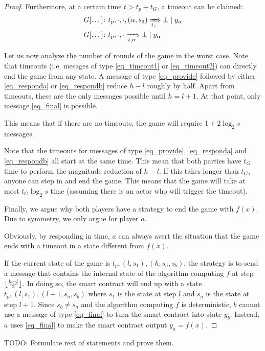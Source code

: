 \documentclass[11pt,letterpaper]{article}
\DeclarePairedDelimiter\floor{\lfloor}{\rfloor}
\begin{document}
\begin{proof}
Furthermore, at a certain time $t > t_p + t_G$, a timeout can be claimed:
\begin{align}
&G[\dots]\colon
    t_p, \cdot, \cdot, (\alpha, s_2)
    \xRightarrow[t, \cdot]{} \bot \mid y_\alpha\label{eq_timeout1}\\
&G[\dots]\colon
    t_p, \cdot, \cdot
    \xRightarrow[t, \alpha]{} \bot \mid y_\alpha\label{eq_timeout2}
\end{align}

Let us now analyze the number of rounds of the game in the worst case. Note that timeouts
(i.e. mesages of type \eqref{eq_timeout1} or \eqref{eq_timeout2}) can directly end the game from
any state.
A message of type
\eqref{eq_provide} followed by either \eqref{eq_responda} or \eqref{eq_respondb} reduce
$h-l$ roughly by half. Apart from timeouts, these are the only messages possible until
$h = l+1$. At that point, only message \eqref{eq_final} is possible.

This means that if there are no timeouts, the game will require $1 + 2 \log_2 s$ messages.

Note that the timeouts for messages of type \eqref{eq_provide}, \eqref{eq_responda} and \eqref{eq_respondb}
all start at the same time. This mean that both parties have $t_G$ time to perform the
magnitude reduction of $h-l$. If this takes longer than $t_G$, anyone can step in and end the game.
This means that the game will take at most $t_G \log_2 s$ time (assuming there is an
actor who will trigger the timeout).

Finally, we argue why both players have a strategy to end the game with $f(x)$.
Due to symmetry, we only argue for player $a$.

Obviously, by responding in time, $a$ can always avert the situation that the game
ends with a timeout in a state different from $f(x)$.

If the current state of the game is $t_p, (l, s_1), (h, s_a, s_b)$, the strategy is
to send a message that contains the internal state of the algorithm computing $f$ at step
$\floor{\frac{h-l}{2}}$. In doing so, the smart contract will end up with a state
$t_p, (l, s_1), (l+1, s_a, s_b)$ where $s_1$ is the state at step $l$ and $s_a$ is the
state at step $l+1$. Since $s_b \neq s_a$ and the algorithm computing $f$ is deterministic,
$b$ cannot use a message of type \eqref{eq_final} to turn the smart contract into
state $y_b$. Instead, $a$ uses \eqref{eq_final} to make the smart contract output $y_a = f(x)$.
\end{proof}

TODO: Formulate rest of statements and prove them.
\end{document}
